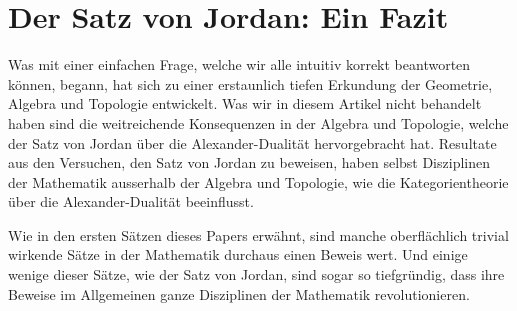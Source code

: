 %
%
%
%
\section{Der Satz von Jordan: Ein Fazit
\label{jordan:section:schlusswort}}

Was mit einer einfachen Frage, welche wir alle intuitiv korrekt beantworten können, begann, hat sich zu einer erstaunlich tiefen Erkundung der Geometrie, Algebra und Topologie entwickelt.
Was wir in diesem Artikel nicht behandelt haben sind die weitreichende Konsequenzen in der Algebra und Topologie, welche der Satz von Jordan über die Alexander-Dualität hervorgebracht hat.
Resultate aus den Versuchen, den Satz von Jordan zu beweisen, haben selbst Disziplinen der Mathematik ausserhalb der Algebra und Topologie, wie die Kategorientheorie über die Alexander-Dualität beeinflusst.

Wie in den ersten Sätzen dieses Papers erwähnt, sind manche oberflächlich trivial wirkende Sätze in der Mathematik durchaus einen Beweis wert.
Und einige wenige dieser Sätze, wie der Satz von Jordan, sind sogar so tiefgründig, dass ihre Beweise im Allgemeinen ganze Disziplinen der Mathematik revolutionieren.